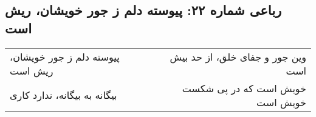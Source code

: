 \begin{center}
\section*{رباعی شماره ۲۲: پیوسته دلم ز جور خویشان، ریش است}
\label{sec:022}
\begin{longtable}{l p{0.5cm} r}
پیوسته دلم ز جور خویشان، ریش است
&&
وین جور و جفای خلق، از حد بیش است
\\
بیگانه به بیگانه، ندارد کاری
&&
خویش است که در پی شکست خویش است
\\
\end{longtable}
\end{center}
